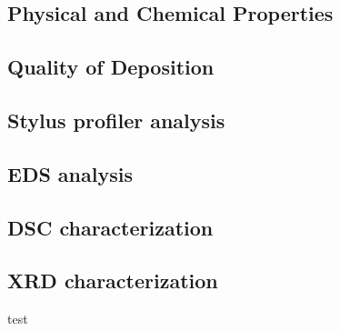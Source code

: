 \documentclass[a4paper,12pt,oneside]{report}%
\begin{document}
\subsection{Physical and Chemical Properties}

\subsection{Quality of Deposition} 
 
\subsection{Stylus profiler analysis}

\subsection{EDS analysis}

\subsection{DSC characterization}

\subsection{XRD characterization}
test
\end{document}
